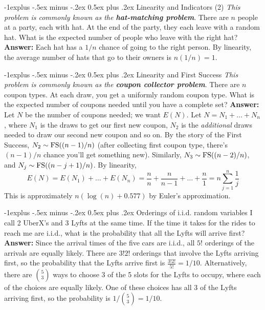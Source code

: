 \documentclass[6pt, landscape]{article}
\makeatletter
\renewcommand{\subsection}{\@startsection{subsection}{2}{0mm}%
                                {-1explus -.5ex minus -.2ex}%
                                {0.5ex plus .2ex}%
                                {\small\bfseries}}
\makeatother
\begin{document}
\begin{multicols}{3}
        \subsection{Linearity and Indicators (2)}
        \emph{This problem is commonly known as the \textbf{hat-matching problem}}. There are $n$ people at a party, each with hat. At the end of the party, they each leave with a random hat. What is the expected number of people who leave with the right hat? \textbf{Answer:} Each hat has a $1/n$ chance of going to the right person. By linearity, the average number of hats that go to their owners is $\boxed{n(1/n) = 1}$.

        \subsection{Linearity and First Success}
        \emph{This problem is commonly known as the \textbf{coupon collector problem}}.
        There are $n$ coupon types. At each draw, you get a uniformly random coupon type. What is the expected number of coupons needed until you have a complete set? \textbf{Answer:} Let $N$ be the number of coupons needed; we want $E(N)$. Let $N = N_1 + \dots + N_n$, where $N_1$ is the draws to get our first new coupon, $N_2$ is the \emph{additional} draws needed to draw our second new coupon and so on. By the story of the First Success, $N_2 \sim \textnormal{FS}((n-1)/n)$ (after collecting first coupon type, there's $(n-1)/n$ chance you'll get something new). Similarly, $N_3 \sim \textnormal{FS}((n-2)/n)$, and $N_j \sim \textnormal{FS}((n-j+1)/n)$. By linearity,
        \[E(N) = E(N_1) + \dots + E(N_n) = \frac{n}{n} + \frac{n}{n-1} + \dots + \frac{n}{1} = \boxed{n\sum^n_{j=1} \frac{1}{j}}\]
        This is approximately $n (\log(n) + 0.577)$ by Euler's approximation.

        \subsection{Orderings of i.i.d. random variables}
        I call 2 UberX's and 3 Lyfts at the same time. If the time it takes for the rides to reach me are i.i.d., what is the probability that all the Lyfts will arrive first? \textbf{Answer:} Since the arrival times of the five cars are i.i.d., all $5!$ orderings of the arrivals are equally likely. There are $3!2!$ orderings that involve the Lyfts arriving first, so the probability that the Lyfts arrive first is $\boxed{\frac{3!2!}{5!} = 1/10}$. Alternatively, there are ${5 \choose 3}$ ways to choose 3 of the 5 slots for the Lyfts to occupy, where each of the choices are equally likely. One of these choices has all 3 of the Lyfts arriving first, so the probability is $\boxed{1 / {5 \choose 3} = 1/10}$.


\end{multicols}
\end{document}

